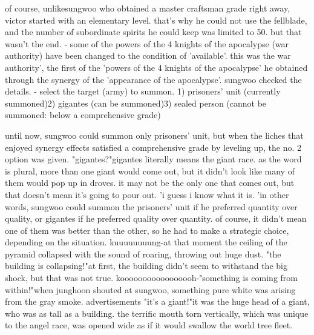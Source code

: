  of course, unlikesungwoo who obtained a master craftsman grade right away, victor started with an elementary level.
 that's why he could not use the fellblade, and the number of subordinate spirits he could keep was limited to 50.
but that wasn't the end.
- some of the powers of the 4 knights of the apocalypse (war authority) have been changed to the condition of 'available'.
this was the war authority', the first of the 'powers of the 4 knights of the apocalypse' he obtained through the synergy of the 'appearance of the apocalypse'.
 sungwoo checked the details.
- select the target (army) to summon.
1) prisoners' unit (currently summoned)2) gigantes (can be summoned)3) sealed person (cannot be summoned: below a comprehensive grade)

until now, sungwoo could summon only prisoners' unit, but when the liches that enjoyed synergy effects satisfied a comprehensive grade by leveling up, the no.
 2 option was given.
"gigantes?"gigantes literally means the giant race.
 as the word is plural, more than one giant would come out, but it didn't look like many of them would pop up in droves.
it may not be the only one that comes out, but that doesn't mean it's going to pour out.
'i guess i know what it is.
'in other words, sungwoo could summon the prisoners' unit if he preferred quantity over quality, or gigantes if he preferred quality over quantity.
 of course, it didn't mean one of them was better than the other, so he had to make a strategic choice, depending on the situation.
kuuuuuuuung-at that moment the ceiling of the pyramid collapsed with the sound of roaring, throwing out huge dust.
 "the building is collapsing!"at first, the building didn't seem to withstand the big shock, but that was not true.
kooooooooooooooooh-"something is coming from within!"when junghoon shouted at sungwoo, something pure white was arising from the gray smoke.
advertisements    "it's a giant!"it was the huge head of a giant, who was as tall as a building.
the terrific mouth torn vertically, which was unique to the angel race, was opened wide as if it would swallow the world tree fleet.


 